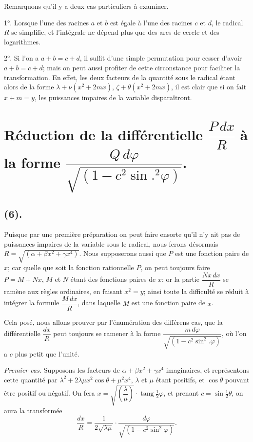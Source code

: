\documentclass{article}
\begin{document}
Remarquons qu'il y a deux cas particuliers à examiner.

1°. Lorsque l'une des racines $a$ et $b$ est égale à l'une des racines $c$ et $d$, le radical $R$ se simplifie, et l'intégrale ne dépend plus que des arcs de cercle et des logarithmes.

2°. Si l'on a $a+b=c+d$, il suffit d'une simple permutation pour cesser d'avoir $a+b=c+d$; mais on peut aussi profiter de cette circonstance pour faciliter la transformation. En effet, les deux facteurs de la quantité sous le radical étant alors de la forme $\lambda+\nu(x^{2}+2mx)$, $\zeta+\theta(x^{2}+2mx)$, il est clair que si on fait $x+m=y$, les puissances impaires de la variable disparaîtront.

\section*{Réduction de la différentielle $\dfrac{P\,dx}{R}$ à la forme $\dfrac{Q\,d\varphi}{\sqrt{(1-c^{2}\sin.^{2}\varphi)}}$.}

\subsection*{(6).}

Puisque par une première préparation on peut faire ensorte qu'il n'y ait pas de puissances impaires de la variable sous le radical, nous ferons désormais $R=\sqrt{(\alpha+\beta x^{2}+\gamma x^{4})}$. Nous supposerons aussi que $P$ est une fonction paire de $x$; car quelle que soit la fonction rationnelle $P$, on peut toujours faire $P=M+Nx$, $M$ et $N$ étant des fonctions paires de $x$: or la partie $\dfrac{Nx\,dx}{R}$ se ramène aux règles ordinaires, en faisant $x^{2}=y$; ainsi toute la difficulté se réduit à intégrer la formule $\dfrac{M\,dx}{R}$, dans laquelle $M$ est une fonction paire de $x$.


Cela posé, nous allons prouver par l'énumération des différens cas, que la différentielle $\dfrac{dx}{R}$ peut toujours se ramener à la forme $\dfrac{m\,d\varphi}{\sqrt{(1-c^{2}\sin^{2}.\varphi)}}$, où l'on a $c$ plus petit que l'unité.

\emph{Premier cas.} Supposons les facteurs de $\alpha+\beta x^{2}+\gamma x^{4}$ imaginaires, et représentons cette quantité par $\lambda^{2}+2\lambda\mu x^{2}\cos\theta+\mu^{2}x^{4}$, $\lambda$ et $\mu$ étant positifs, et $\cos\theta$ pouvant être positif ou négatif. On fera $x=\sqrt{\left(\dfrac{\lambda}{\mu}\right)}\cdot\operatorname{tang}\tfrac{1}{2}\varphi$, et prenant $c=\sin\tfrac{1}{2}\theta$, on aura la transformée
\[ \frac{dx}{R}=\frac{1}{2\sqrt{\lambda\mu}}\cdot\frac{d\varphi}{\sqrt{(1-c^{2}\sin^{2}\varphi)}}. \]
\end{document}

